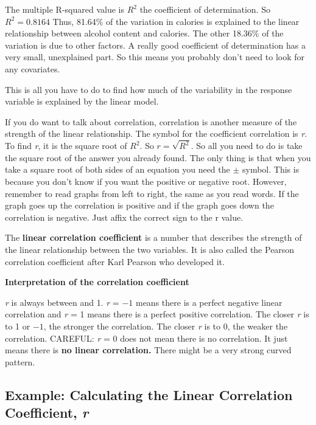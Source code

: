 \documentclass[
]{book}
\begin{document}
The multiple R-squared value is \(R^2\) the coefficient of determination. So \(R^2=0.8164\)
Thus, 81.64\% of the variation in calories is explained to the linear relationship between alcohol content and calories. The other 18.36\% of the variation is due to other factors. A really good coefficient of determination has a very small, unexplained part. So this means you probably don't need to look for any covariates.

This is all you have to do to find how much of the variability in the response variable is explained by the linear model.

If you do want to talk about correlation, correlation is another measure of the strength of the linear relationship. The symbol for the coefficient correlation is \emph{r}. To find \emph{r}, it is the square root of \(R^2\). So \(r=\sqrt{R^2}\). So all you need to do is take the square root of the answer you already found. The only thing is that when you take a square root of both sides of an equation you need the \(\pm\) symbol. This is because you don't know if you want the positive or negative root. However, remember to read graphs from left to right, the same as you read words. If the graph goes up the correlation is positive and if the graph goes down the correlation is negative. Just affix the correct sign to the r value.

The \textbf{linear correlation coefficient} is a number that describes the strength of the linear relationship between the two variables. It is also called the Pearson correlation coefficient after Karl Pearson who developed it.

\textbf{Interpretation of the correlation coefficient}

\emph{r} is always between and 1. \emph{r} = \(-1\) means there is a perfect negative linear correlation and \emph{r} = 1 means there is a perfect positive correlation. The closer \emph{r} is to 1 or \(-1\), the stronger the correlation. The closer \emph{r} is to 0, the weaker the correlation. CAREFUL: \emph{r} = 0 does not mean there is no correlation. It just means there is \textbf{no linear correlation.} There might be a very strong curved pattern.

\hypertarget{example-calculating-the-linear-correlation-coefficient-r}{%
\subsection{\texorpdfstring{Example: Calculating the Linear Correlation Coefficient, \emph{r}}{Example: Calculating the Linear Correlation Coefficient, r}}\label{example-calculating-the-linear-correlation-coefficient-r}}
\end{document}
